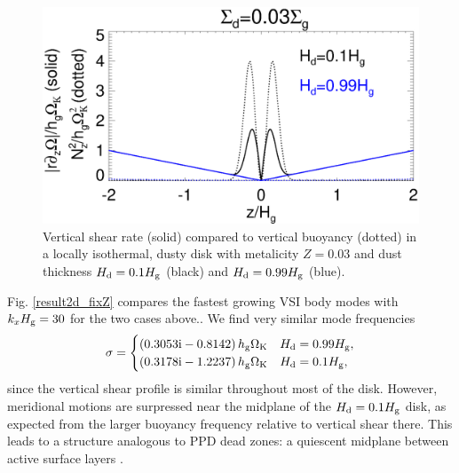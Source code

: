 \begin{figure}
  \includegraphics[width=\linewidth]{figures/compare_vshear_Nz2_fixZ} 
  \caption{Vertical shear rate (solid) compared to vertical buoyancy
    (dotted) in a locally isothermal, dusty disk 
    with metalicity $Z=0.03$ and dust thickness $H_\mathrm{d}=0.1H_\mathrm{g}$
    (black) and $H_\mathrm{d}=0.99H_\mathrm{g}$ (blue). 
    \label{compare_vshear_fixZ}
    }
\end{figure}

Fig. \ref{result2d_fixZ} compares the fastest growing VSI body modes  
with $k_xH_\mathrm{g}=30$ for the two cases above..   
We find very similar mode 
frequencies 
\begin{align*}
  \sigma = \begin{cases}
    \left(0.3053\mathrm{i} - 0.8142\right)h_\mathrm{g}\Omega_{\rm K} & H_\mathrm{d}=0.99H_\mathrm{g}, \\
    \left(0.3178\mathrm{i} - 1.2237\right)h_\mathrm{g}\Omega_{\rm K} & H_\mathrm{d}=0.1H_\mathrm{g},
  \end{cases}
\end{align*}
since the vertical shear profile is similar throughout most of the
disk. However, meridional motions are surpressed near the midplane of
the $H_\mathrm{d}=0.1H_\mathrm{g}$ disk, as expected from the larger buoyancy frequency
relative to vertical shear there. This leads to a structure
analogous to PPD dead zones: a quiescent midplane between active
surface layers \citep{gammie96}.  


